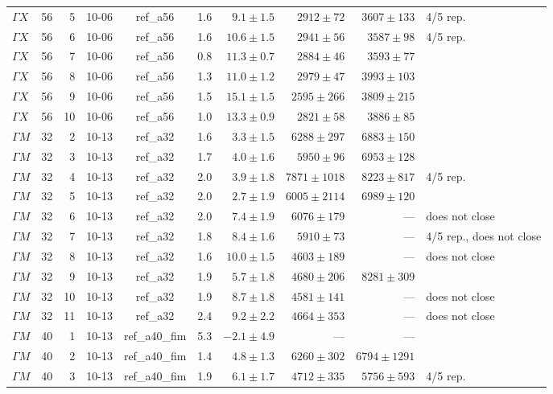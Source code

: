 \documentclass[9pt,a4paper,twocolumn]{extarticle}
\begin{document}
\begin{table}[h]
\begin{tabular}{llrlcrrrrl}
$\Gamma X$ & 56 & 5 & 10-06 & ref\_a56 & 1.6 & $9.1\pm1.5$ & $2912\pm72$ & $3607\pm133$ & 4/5 rep. \\
$\Gamma X$ & 56 & 6 & 10-06 & ref\_a56 & 1.6 & $10.6\pm1.5$ & $2941\pm56$ & $3587\pm98$ & 4/5 rep. \\
$\Gamma X$ & 56 & 7 & 10-06 & ref\_a56 & 0.8 & $11.3\pm0.7$ & $2884\pm46$ & $3593\pm77$ &  \\
$\Gamma X$ & 56 & 8 & 10-06 & ref\_a56 & 1.3 & $11.0\pm1.2$ & $2979\pm47$ & $3993\pm103$ &  \\
$\Gamma X$ & 56 & 9 & 10-06 & ref\_a56 & 1.5 & $15.1\pm1.5$ & $2595\pm266$ & $3809\pm215$ &  \\
$\Gamma X$ & 56 & 10 & 10-06 & ref\_a56 & 1.0 & $13.3\pm0.9$ & $2821\pm58$ & $3886\pm85$ &  \\
\midrule
$\Gamma M$ & 32 & 2 & 10-13 & ref\_a32 & 1.6 & $3.3\pm1.5$ & $6288\pm297$ & $6883\pm150$ &  \\
$\Gamma M$ & 32 & 3 & 10-13 & ref\_a32 & 1.7 & $4.0\pm1.6$ & $5950\pm96$ & $6953\pm128$ &  \\
$\Gamma M$ & 32 & 4 & 10-13 & ref\_a32 & 2.0 & $3.9\pm1.8$ & $7871\pm1018$ & $8223\pm817$ & 4/5 rep. \\
$\Gamma M$ & 32 & 5 & 10-13 & ref\_a32 & 2.0 & $2.7\pm1.9$ & $6005\pm2114$ & $6989\pm120$ &  \\
$\Gamma M$ & 32 & 6 & 10-13 & ref\_a32 & 2.0 & $7.4\pm1.9$ & $6076\pm179$ & --- & does not close \\
$\Gamma M$ & 32 & 7 & 10-13 & ref\_a32 & 1.8 & $8.4\pm1.6$ & $5910\pm73$ & --- & 4/5 rep., does not close \\
$\Gamma M$ & 32 & 8 & 10-13 & ref\_a32 & 1.6 & $10.0\pm1.5$ & $4603\pm189$ & --- & does not close \\
$\Gamma M$ & 32 & 9 & 10-13 & ref\_a32 & 1.9 & $5.7\pm1.8$ & $4680\pm206$ & $8281\pm309$ &  \\
$\Gamma M$ & 32 & 10 & 10-13 & ref\_a32 & 1.9 & $8.7\pm1.8$ & $4581\pm141$ & --- & does not close \\
$\Gamma M$ & 32 & 11 & 10-13 & ref\_a32 & 2.4 & $9.2\pm2.2$ & $4664\pm353$ & --- & does not close \\
\midrule
$\Gamma M$ & 40 & 1 & 10-13 & ref\_a40\_fim & 5.3 & $-2.1\pm4.9$ & --- & --- &  \\
$\Gamma M$ & 40 & 2 & 10-13 & ref\_a40\_fim & 1.4 & $4.8\pm1.3$ & $6260\pm302$ & $6794\pm1291$ &  \\
$\Gamma M$ & 40 & 3 & 10-13 & ref\_a40\_fim & 1.9 & $6.1\pm1.7$ & $4712\pm335$ & $5756\pm593$ & 4/5 rep. \\

\end{tabular}
\end{table}
\end{document}
